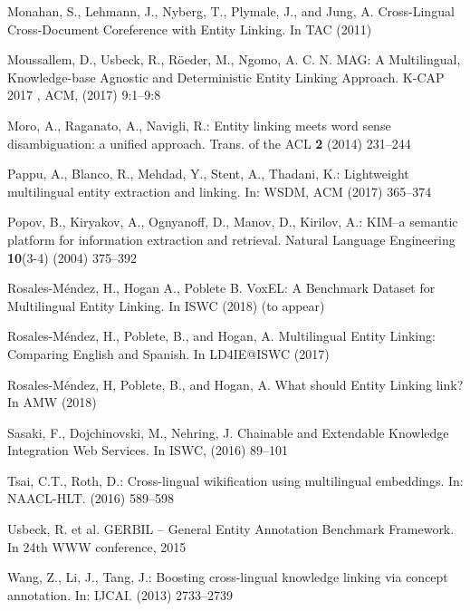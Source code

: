 \documentclass{llncs}
\begin{document}
\begin{thebibliography}{99}
Monahan, S., Lehmann, J., Nyberg, T., Plymale, J., and Jung, A. Cross-Lingual Cross-Document Coreference with Entity Linking. In TAC (2011)

Moussallem, D., Usbeck, R., R\"oeder, M., Ngomo, A. C. N. {MAG}: {A} Multilingual, Knowledge-base Agnostic and Deterministic Entity Linking Approach. {K-CAP} 2017 , ACM, (2017) 9:1--9:8

Moro, A., Raganato, A., Navigli, R.: Entity linking meets word sense disambiguation: a unified approach. Trans. of the ACL \textbf{2} (2014) 231--244

Pappu, A., Blanco, R., Mehdad, Y., Stent, A., Thadani, K.: Lightweight multilingual entity extraction and linking. In: WSDM, ACM (2017) 365--374

Popov, B., Kiryakov, A., Ognyanoff, D., Manov, D., Kirilov, A.: KIM--a semantic platform for information extraction and retrieval. Natural Language Engineering \textbf{10}(3-4) (2004) 375--392

Rosales-Méndez, H., Hogan A., Poblete B. VoxEL: A Benchmark Dataset for Multilingual Entity Linking. In ISWC (2018) (to appear)

Rosales-Méndez, H., Poblete, B., and Hogan, A. Multilingual Entity Linking: Comparing English and Spanish. In LD4IE@ISWC (2017)

Rosales-Méndez, H, Poblete, B., and Hogan, A. What should Entity Linking link? In AMW (2018)

Sasaki, F., Dojchinovski, M., Nehring, J. Chainable and Extendable Knowledge Integration Web Services. In ISWC, (2016) 89--101

Tsai, C.T., Roth, D.: Cross-lingual wikification using multilingual embeddings. In: NAACL-HLT. (2016) 589--598

Usbeck, R. et al. GERBIL -- General Entity Annotation Benchmark Framework. In 24th WWW conference, 2015

Wang, Z., Li, J., Tang, J.: Boosting cross-lingual knowledge linking via concept annotation. In: IJCAI. (2013) 2733--2739


\end{thebibliography}
\end{document}
